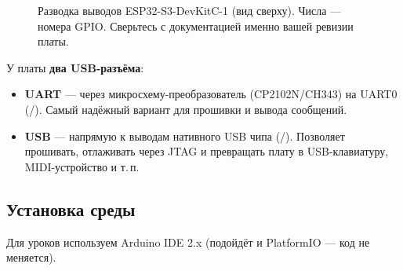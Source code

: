 \begin{figure}[H]
\caption{Разводка выводов ESP32-S3-DevKitC-1 (вид сверху). Числа --- номера GPIO.
Сверьтесь с документацией именно вашей ревизии платы.}
\end{figure}

У платы \textbf{два USB-разъёма}:
\begin{itemize}
  \item \textbf{UART} --- через микросхему-преобразователь (CP2102N/CH343) на UART0 (/).
        Самый надёжный вариант для прошивки и вывода сообщений.
  \item \textbf{USB} --- напрямую к выводам нативного USB чипа (/). Позволяет
        прошивать, отлаживать через JTAG и превращать плату в USB-клавиатуру, MIDI-устройство и т.\,п.
\end{itemize}

\subsection{Установка среды}

Для уроков используем Arduino IDE 2.x (подойдёт и PlatformIO --- код не меняется).

